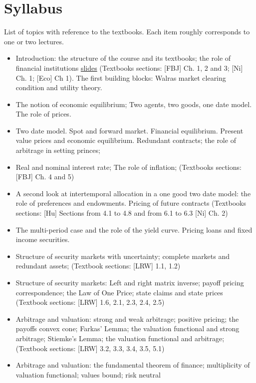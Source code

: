 \documentclass[11pt]{article}
\begin{document}
\section{Syllabus}
\label{sec-3}

List of topics with reference to the textbooks. Each item roughly
corresponds to one or two lectures.

\begin{itemize}
\item Introduction: the structure of the course and its textbooks; the
role of financial institutions \href{https://docs.google.com/presentation/d/1fPWtpCZgLpRXPdWiiNIE9HtLyaMs5hSaSQqVL_Gj7No/edit?usp=sharing}{slides} (Textbooks sections: [FBJ]
Ch. 1, 2 and 3; [Ni] Ch. 1; [Eco] Ch 1). The first building
blocks: Walras market clearing condition and utility theory.
\item The notion of economic equilibrium; Two agents, two goods, one
date model. The role of prices.
\item Two date model. Spot and forward market. Financial
equilibrium. Present value prices and economic
equilibrium. Redundant contracts; the role of arbitrage in setting
princes;
\item Real and nominal interest rate; The role of inflation; (Textbooks
sections: [FBJ] Ch. 4 and 5)
\item A second look at intertemporal allocation in a one good two date
model: the role of preferences and endowments. Pricing of future
contracts (Textbooks sections: [Hu] Sections from 4.1 to 4.8 and
from 6.1 to 6.3 [Ni] Ch. 2)
\item The multi-period case and the role of the yield curve. Pricing
loans and fixed income securities.
\item Structure of security markets with uncertainty; complete markets
and redundant assets; (Textbook sections: [LRW] 1.1, 1.2)
\item Structure of security markets: Left and right matrix inverse;
payoff pricing correspondence; the Law of One Price; state claims
and state prices (Textbook sections: [LRW] 1.6, 2.1, 2.3, 2.4,
2.5)
\item Arbitrage and valuation: strong and weak arbitrage; positive
pricing; the payoffs convex cone; Farkas' Lemma; the valuation
functional and strong arbitrage; Stiemke's Lemma; the valuation
functional and arbitrage; (Textbook sections: [LRW] 3.2, 3.3, 3.4,
3.5, 5.1)
\item Arbitrage and valuation: the fundamental theorem of finance;
multiplicity of valuation functional; values bound; risk neutral

\end{itemize}
\end{document}
